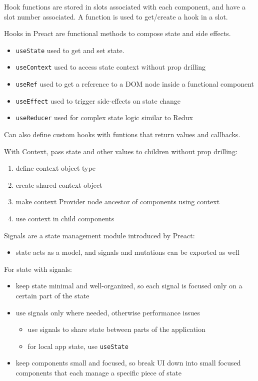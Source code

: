 \documentclass[11pt]{article}
\begin{document}
Hook functions are stored in slots associated with each component, and have a slot number
associated.
A function is used to get/create a hook in a slot.

Hooks in Preact are functional methods to compose state and side effects.
\begin{itemize}
\item \texttt{useState} used to get and set state.
\item \texttt{useContext} used to access state context without prop drilling
\item \texttt{useRef} used to get a reference to a DOM node inside a functional component
\item \texttt{useEffect} used to trigger side-effects on state change
\item \texttt{useReducer} used for complex state logic similar to Redux
\end{itemize}

Can also define custom hooks with funtions that return values and callbacks.

With Context, pass state and other values to children without prop drilling:
\begin{enumerate}
\item define context object type
\item create shared context object
\item make context Provider node ancestor of components using context
\item use context in child components
\end{enumerate}

Signals are a state management module introduced by Preact:
\begin{itemize}
\item state acts as a model, and signals and mutations can be exported as well
\end{itemize}

For state with signals:
\begin{itemize}
\item keep state minimal and well-organized, so each signal is focused only on a certain part of
the state
\item use signals only where needed, otherwise performance issues
\begin{itemize}
\item use signals to share state between parts of the application
\item for local app state, use \texttt{useState}
\end{itemize}
\item keep components small and focused, so break UI down into small focused components that each
manage a specific piece of state
\end{itemize}
\end{document}
